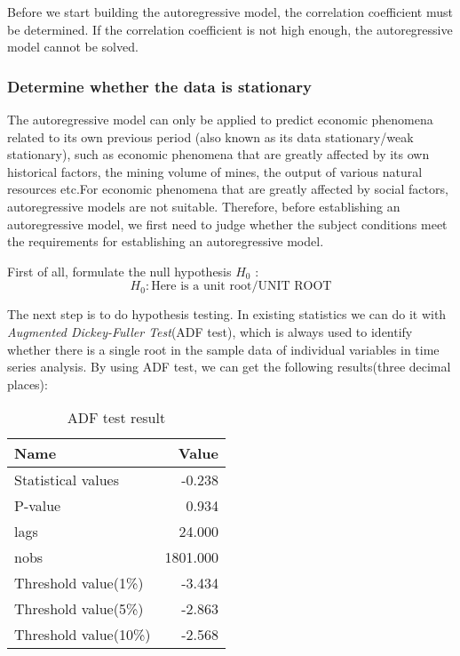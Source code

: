 \documentclass{mcmthesis}
\begin{document}
Before we start building the autoregressive model, the correlation coefficient must be determined. If the correlation coefficient is not high enough, the autoregressive model cannot be solved.

\subsubsection{Determine whether the data is stationary}
The autoregressive model can only be applied to predict economic phenomena related to its own previous period (also known as its data stationary/weak stationary), such as economic phenomena that are greatly affected by its own historical factors, the mining volume of mines, the output of various natural resources etc.For economic phenomena that are greatly affected by social factors, autoregressive models are not suitable. Therefore, before establishing an autoregressive model, we first need to judge whether the subject conditions meet the requirements for establishing an autoregressive model.

First of all, formulate the null hypothesis $H_0$ :
\[
 H_0 : \mbox{Here is a unit root/UNIT ROOT}
\]

The next step is to do hypothesis testing.
In existing statistics we can do it with \textit{Augmented Dickey-Fuller Test}(ADF test), which is always used to identify whether there is a single root in the sample data of individual variables in time series analysis.
By using ADF test, we can get the following results(three decimal places):

\begin{table}[h]
  \centering
  \begin{tabular}{@{}lr@{}}
    \toprule
    Name & Value \\
    \midrule
    Statistical values & -0.238 \\
    P-value & 0.934 \\
    lags & 24.000 \\
    nobs & 1801.000 \\
    Threshold value(1\%) & -3.434 \\
    Threshold value(5\%) & -2.863 \\
    Threshold value(10\%) & -2.568 \\
    \bottomrule
  \end{tabular}
  \caption{ADF test result}
\end{table}
\end{document}
